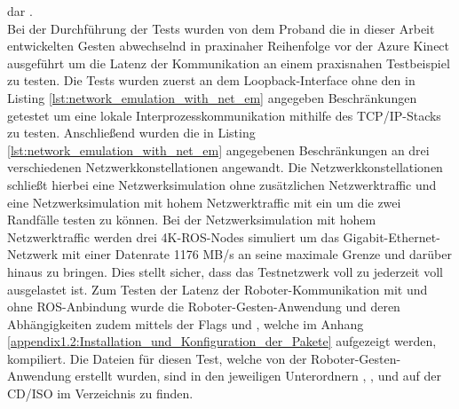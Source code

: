 dar \cite{admin_understanding_2018}.\\

Bei der Durchführung der Tests wurden von dem Proband die in dieser Arbeit entwickelten Gesten abwechselnd in praxinaher Reihenfolge vor der Azure Kinect ausgeführt um die Latenz der Kommunikation an einem praxisnahen Testbeispiel zu testen. Die Tests wurden zuerst an dem Loopback-Interface ohne den in Listing \ref{lst:network_emulation_with_net_em} angegeben Beschränkungen getestet um eine lokale Interprozesskommunikation mithilfe des TCP/IP-Stacks zu testen. Anschließend wurden die in Listing \ref{lst:network_emulation_with_net_em} angegebenen Beschränkungen an drei verschiedenen Netzwerkkonstellationen angewandt. Die Netzwerkkonstellationen schließt hierbei eine Netzwerksimulation ohne zusätzlichen Netzwerktraffic und eine Netzwerksimulation mit hohem Netzwerktraffic mit ein um die zwei Randfälle testen zu können. Bei der Netzwerksimulation mit hohem Netzwerktraffic werden drei 4K-ROS-Nodes simuliert um das Gigabit-Ethernet-Netzwerk mit einer Datenrate 1176 MB/s an seine maximale Grenze und darüber hinaus zu bringen. Dies stellt sicher, dass das Testnetzwerk voll zu jederzeit voll ausgelastet ist. Zum Testen der Latenz der Roboter-Kommunikation mit und ohne ROS-Anbindung wurde die Roboter-Gesten-Anwendung und deren Abhängigkeiten zudem mittels der Flags  und , welche im Anhang \ref{appendix1.2:Installation_und_Konfiguration_der_Pakete} aufgezeigt werden, kompiliert. Die Dateien für diesen Test, welche von der Roboter-Gesten-Anwendung erstellt wurden, sind in den jeweiligen Unterordnern , ,  und  auf der CD/ISO im Verzeichnis  zu finden.

